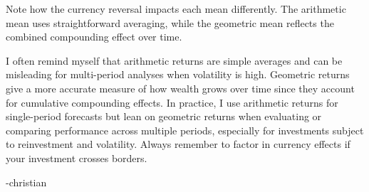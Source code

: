 Note how the currency reversal impacts each mean differently. The arithmetic mean uses straightforward averaging, while the geometric mean reflects the combined compounding effect over time.

\begin{infobox}

I often remind myself that arithmetic returns are simple averages and can be misleading for multi-period analyses when volatility is high. Geometric returns give a more accurate measure of how wealth grows over time since they account for cumulative compounding effects. In practice, I use arithmetic returns for single-period forecasts but lean on geometric returns when evaluating or comparing performance across multiple periods, especially for investments subject to reinvestment and volatility. Always remember to factor in currency effects if your investment crosses borders.  

-christian

\end{infobox}